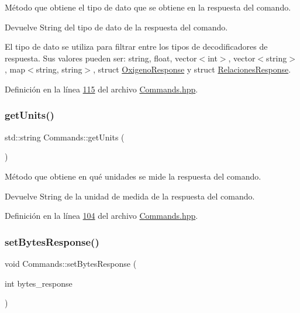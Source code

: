 Método que obtiene el tipo de dato que se obtiene en la respuesta del comando. 

\begin{DoxyReturn}{Devuelve}
String del tipo de dato de la respuesta del comando.
\end{DoxyReturn}
El tipo de dato se utiliza para filtrar entre los tipos de decodificadores de respuesta. Sus valores pueden ser\+: string, float, vector$<$int$>$, vector$<$string$>$, map$<$string, string$>$, struct \hyperlink{structOxigenoResponse}{Oxigeno\+Response} y struct \hyperlink{structRelacionesResponse}{Relaciones\+Response}. 

Definición en la línea \hyperlink{Commands_8hpp_source_l00115}{115} del archivo \hyperlink{Commands_8hpp_source}{Commands.\+hpp}.

\mbox{\label{classCommands_ac67214a4fbd93fbb4d8ebb2dd815a3fa}} 
\subsubsection{\texorpdfstring{get\+Units()}{getUnits()}}
{\footnotesize\ttfamily std\+::string Commands\+::get\+Units (\begin{DoxyParamCaption}{ }\end{DoxyParamCaption})\hspace{0.3cm}{\ttfamily [inline]}}



Método que obtiene en qué unidades se mide la respuesta del comando. 

\begin{DoxyReturn}{Devuelve}
String de la unidad de medida de la respuesta del comando. 
\end{DoxyReturn}


Definición en la línea \hyperlink{Commands_8hpp_source_l00104}{104} del archivo \hyperlink{Commands_8hpp_source}{Commands.\+hpp}.

\mbox{\label{classCommands_a77c946b91fa3f3b7dbdc51ea1cc8208a}} 
\subsubsection{\texorpdfstring{set\+Bytes\+Response()}{setBytesResponse()}}
{\footnotesize\ttfamily void Commands\+::set\+Bytes\+Response (\begin{DoxyParamCaption}\item[{int}]{bytes\+\_\+response }\end{DoxyParamCaption})\hspace{0.3cm}{\ttfamily [inline]}}



